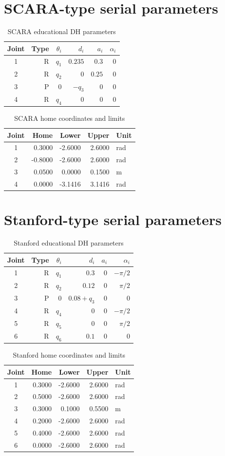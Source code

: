 \section{SCARA-type serial parameters}
\begin{table}[H]\centering
\caption{SCARA educational DH parameters}
\begin{tabular}{crrrrr}\toprule
Joint & Type & $\theta_i$ & $d_i$ & $a_i$ & $\alpha_i$\\\midrule
1&R&$q_1$&$0.235$&$0.3$&$0$\\
2&R&$q_2$&$0$&$0.25$&$0$\\
3&P&$0$&$-q_3$&$0$&$0$\\
4&R&$q_4$&$0$&$0$&$0$\\
\bottomrule\end{tabular}\end{table}
\begin{table}[H]\centering
\caption{SCARA home coordinates and limits}
\begin{tabular}{crrrl}\toprule Joint & Home & Lower & Upper & Unit\\\midrule
1&0.3000&-2.6000&2.6000&rad\\
2&-0.8000&-2.6000&2.6000&rad\\
3&0.0500&0.0000&0.1500&m\\
4&0.0000&-3.1416&3.1416&rad\\
\bottomrule\end{tabular}\end{table}
\clearpage
\section{Stanford-type serial parameters}
\begin{table}[H]\centering
\caption{Stanford educational DH parameters}
\begin{tabular}{crrrrr}\toprule
Joint & Type & $\theta_i$ & $d_i$ & $a_i$ & $\alpha_i$\\\midrule
1&R&$q_1$&$0.3$&$0$&$-\pi/2$\\
2&R&$q_2$&$0.12$&$0$&$\pi/2$\\
3&P&$0$&$0.08+q_3$&$0$&$0$\\
4&R&$q_4$&$0$&$0$&$-\pi/2$\\
5&R&$q_5$&$0$&$0$&$\pi/2$\\
6&R&$q_6$&$0.1$&$0$&$0$\\
\bottomrule\end{tabular}\end{table}
\begin{table}[H]\centering
\caption{Stanford home coordinates and limits}
\begin{tabular}{crrrl}\toprule Joint & Home & Lower & Upper & Unit\\\midrule
1&0.3000&-2.6000&2.6000&rad\\
2&0.5000&-2.6000&2.6000&rad\\
3&0.3000&0.1000&0.5500&m\\
4&0.2000&-2.6000&2.6000&rad\\
5&0.4000&-2.6000&2.6000&rad\\
6&0.0000&-2.6000&2.6000&rad\\
\bottomrule\end{tabular}\end{table}
\clearpage
